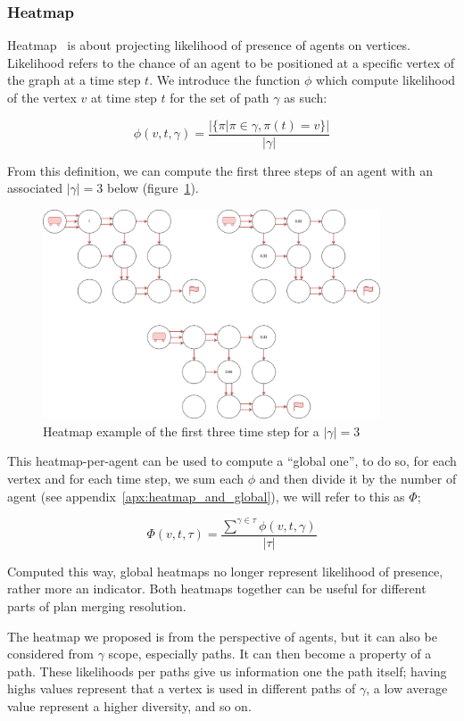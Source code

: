 \subsubsection{Heatmap}\label{sec:heatmap}

Heatmap~\cite{atstfestko20a} is about projecting likelihood of presence of agents on vertices. Likelihood refers to the chance of an agent to be positioned at a specific vertex of the graph at a time step \(t\). We introduce the function \(\phi\) which compute likelihood of the vertex \(v\) at time step \(t\) for the set of path \(\gamma\) as such:

\[
  \phi(v, t, \gamma) = \frac{ |\{ \pi | \pi \in \gamma, \pi(t) = v \}|}{|\gamma| }
\]
  
From this definition, we can compute the first three steps of an agent with an associated \(|\gamma|=3\) below (figure~\ref{img:heatmap}).

\begin{figure}[H]
  \centering
  \caption{Heatmap example of the first three time step for a \(|\gamma|=3\) }\label{img:heatmap}
  \includegraphics[width=10cm]{img/heatmap.drawio.png}
\end{figure}

This heatmap-per-agent can be used to compute a ``global one'', to do so, for each vertex and for each time step, we sum each \(\phi\) and then divide it by the number of agent (see appendix~\ref{apx:heatmap_and_global}), we will refer to this as \(\Phi\);

\[
  \Phi(v,t,\tau) = \frac{ {\sum^{\gamma \in \tau} }{\phi(v,t,\gamma)}}  {|\tau|}
\]

Computed this way, global heatmaps no longer represent likelihood of presence, rather more an indicator. Both heatmaps together can be useful for different parts of plan merging resolution.

The heatmap we proposed is from the perspective of agents, but it can also be considered from \(\gamma\) scope, especially paths. It can then become a property of a path. These likelihoods per paths give us information one the path itself; having highs values represent that a vertex is used in different paths of \(\gamma\), a low average value represent a higher diversity, and so on.

